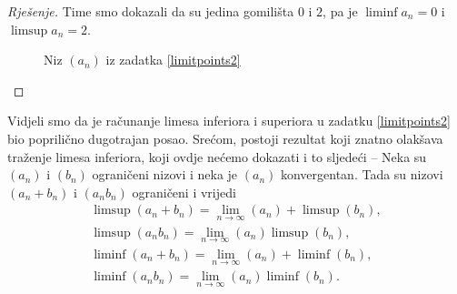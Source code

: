 \begin{proof}[Rješenje]
Time smo dokazali da su jedina gomilišta $0$ i $2$, pa je $\liminf{a_n}=0$ i $\limsup{a_n}=2$.
\begin{figure}[ht]
\begin{center}
\caption{Niz $(a_n)$ iz zadatka \ref{limitpoints2}}
\label{fig:6.1}
\end{center}
\end{figure}
\end{proof}
\begin{remark}
Vidjeli smo da je računanje limesa inferiora i superiora u zadatku \ref{limitpoints2} bio poprilično dugotrajan posao. Srećom, postoji rezultat koji znatno olakšava traženje limesa inferiora, koji ovdje nećemo dokazati i to sljedeći -- Neka su $(a_n)$ i $(b_n)$ ograničeni nizovi i neka je $(a_n)$ konvergentan. Tada su nizovi $(a_n+b_n)$ i $(a_nb_n)$ ograničeni i vrijedi
\begin{gather*}
\limsup(a_n+b_n)=\lim\limits_{n\to \infty}(a_n)+\limsup(b_n),\\
\limsup(a_nb_n)=\lim\limits_{n\to \infty}(a_n)\limsup(b_n),\\
\liminf(a_n+b_n)=\lim\limits_{n\to \infty}(a_n)+\liminf(b_n),\\
\liminf(a_nb_n)=\lim\limits_{n\to \infty}(a_n)\liminf(b_n).
\end{gather*}
\end{remark}
\newpage
